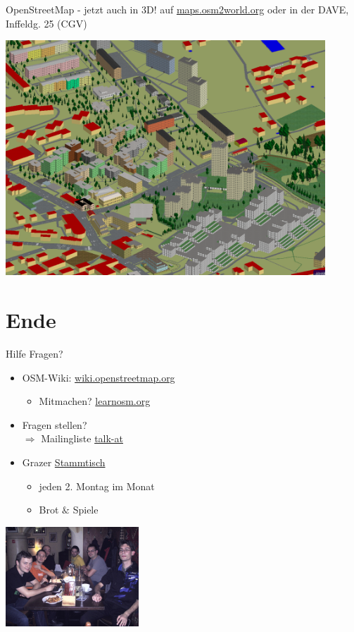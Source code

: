 \documentclass{beamer}
\begin{document}
\begin{frame}{OpenStreetMap - jetzt auch in 3D! }
    auf \href{http://maps.osm2world.org/?zoom=17&lat=47.06156&lon=15.46983&layers=BF0FTFFF}{maps.osm2world.org} oder in der DAVE, Inffeldg. 25 (CGV)

  \includegraphics[width=0.9\textwidth]{3d.png}


\end{frame}

\section{Ende}

\begin{frame}{Hilfe}
Fragen? 
\begin{itemize}
  \item OSM-Wiki: \href{http://wiki.openstreetmap.org}{wiki.openstreetmap.org}
  \begin{itemize} 
    \item Mitmachen? \href{http://learnosm.org/}{learnosm.org}
  \end{itemize}
  \item Fragen stellen? \\ $\Rightarrow$ Mailingliste \href{http://lists.openstreetmap.org/listinfo/talk-at}{talk-at}
\vspace{1cm}
  \item Grazer \href{https://wiki.openstreetmap.org/wiki/Graz/Stammtisch}{Stammtisch}
  \begin{itemize}
      \item jeden 2. Montag im Monat 
      \item Brot $\&$ Spiele
  \end{itemize}

\end{itemize}

 \vspace*{-2.0cm}
\hfill\includegraphics[width=5cm]{Osm_graz_members_2011.jpeg}

\end{frame}
\end{document}
